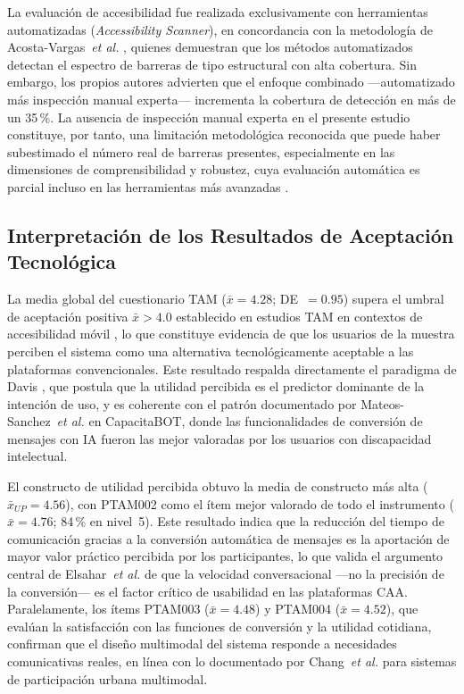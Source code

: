 \documentclass[journal]{IEEEtran}
\begin{document}
			La evaluaci\'on de accesibilidad fue realizada exclusivamente con herramientas automatizadas (\textit{Accessibility Scanner}), en concordancia con la metodolog\'ia de Acosta-Vargas~\textit{et al.} \cite{acosta2021}, quienes demuestran que los m\'etodos automatizados detectan el espectro de barreras de tipo estructural con alta cobertura. Sin embargo, los propios autores advierten que el enfoque combinado ---automatizado m\'as inspecci\'on manual experta--- incrementa la cobertura de detecci\'on en m\'as de un 35\,\%. La ausencia de inspecci\'on manual experta en el presente estudio constituye, por tanto, una limitaci\'on metodol\'ogica reconocida que puede haber subestimado el n\'umero real de barreras presentes, especialmente en las dimensiones de comprensibilidad y robustez, cuya evaluaci\'on autom\'atica es parcial incluso en las herramientas m\'as avanzadas \cite{ara2024}.
			
		\subsection{Interpretaci\'on de los Resultados de Aceptaci\'on Tecnol\'ogica}
			La media global del cuestionario TAM ($\bar{x}=4.28$; DE~$=0.95$) supera el umbral de aceptaci\'on positiva $\bar{x} > 4.0$ establecido en estudios TAM en contextos de accesibilidad m\'ovil \cite{julianto2023}, lo que constituye evidencia de que los usuarios de la muestra perciben el sistema como una alternativa tecnol\'ogicamente aceptable a las plataformas convencionales. Este resultado respalda directamente el paradigma de Davis \cite{davis1989}, que postula que la utilidad percibida es el predictor dominante de la intenci\'on de uso, y es coherente con el patr\'on documentado por Mateos-Sanchez~\textit{et al.} \cite{mateos2022} en CapacitaBOT, donde las funcionalidades de conversi\'on de mensajes con IA fueron las mejor valoradas por los usuarios con discapacidad intelectual.
			
			El constructo de utilidad percibida obtuvo la media de constructo m\'as alta ($\bar{x}_{UP}=4.56$), con PTAM002 como el \'item mejor valorado de todo el instrumento ($\bar{x}=4.76$; 84\,\% en nivel~5). Este resultado indica que la reducci\'on del tiempo de comunicaci\'on gracias a la conversi\'on autom\'atica de mensajes es la aportaci\'on de mayor valor pr\'actico percibida por los participantes, lo que valida el argumento central de Elsahar~\textit{et al.} \cite{elsahar2019} de que la velocidad conversacional ---no la precisi\'on de la conversi\'on--- es el factor cr\'itico de usabilidad en las plataformas CAA. Paralelamente, los \'items PTAM003 ($\bar{x}=4.48$) y PTAM004 ($\bar{x}=4.52$), que eval\'uan la satisfacci\'on con las funciones de conversi\'on y la utilidad cotidiana, confirman que el dise\~no multimodal del sistema responde a necesidades comunicativas reales, en l\'inea con lo documentado por Chang~\textit{et al.} \cite{chang2022} para sistemas de participaci\'on urbana multimodal.
			
\end{document}
